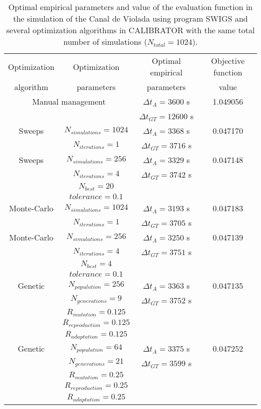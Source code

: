 \documentclass[review,authoryear]{elsarticle}
\newcommand{\TABLE}[5]
{
	\begin{table}[ht!]
		\centering
		\caption{#4.\label{#5}}
		#1
		\begin{tabular}{#2}
			#3
		\end{tabular}
	\end{table}
}
\begin{document}
\TABLE{\scriptsize}{cccc}
{
	Optimization & Optimization & Optimal empirical & Objective function
	\\ algorithm & parameters & parameters & value
	\\ \hline
	\multicolumn{2}{c}{Manual management} & $\Delta t_A=3600$ s & 1.049056
	\\ & & $\Delta t_{GT}=12600$ s
	\\ \hline
	Sweeps & $N_{simulations}=1024$ & $\Delta t_A=3368$ s & 0.047170
	\\ & $N_{iterations}=1$ & $\Delta t_{GT}=3716$ s
	\\ \hline
	Sweeps & $N_{simulations}=256$ & $\Delta t_A=3329$ s & 0.047148
	\\ & $N_{iterations}=4$ & $\Delta t_{GT}=3742$ s
	\\ & $N_{best}=20$ &
	\\ & $tolerance=0.1$
	\\ \hline
	Monte-Carlo & $N_{simulations}=1024$ & $\Delta t_A=3193$ s & 0.047183
	\\ & $N_{iterations}=1$ & $\Delta t_{GT}=3705$ s
	\\ \hline
	Monte-Carlo & $N_{simulations}=256$ & $\Delta t_A=3250$ s & 0.047139
	\\ & $N_{iterations}=4$ & $\Delta t_{GT}=3751$ s
	\\ & $N_{best}=4$
	\\ & $tolerance=0.1$
	\\ \hline
	Genetic & $N_{population}=256$ & $\Delta t_A=3363$ s & 0.047135
	\\ & $N_{generations}=9$ & $\Delta t_{GT}=3752$ s
	\\ & $R_{mutation}=0.125$
	\\ & $R_{reproduction}=0.125$
	\\ & $R_{adaptation}=0.125$
	\\ \hline
	Genetic & $N_{population}=64$ & $\Delta t_A=3375$ s & 0.047252
	\\ & $N_{generations}=21$ & $\Delta t_{GT}=3599$ s
	\\ & $R_{mutation}=0.25$
	\\ & $R_{reproduction}=0.25$
	\\ & $R_{adaptation}=0.25$
	\\ \hline
}{Optimal empirical parameters and value of the evaluation function in the simulation of the Canal de Violada using program SWIGS and several optimization algorithms in CALIBRATOR with the same total number of simulations ($N_{total}=1024$)}
{TabSwigs}
\end{document}
